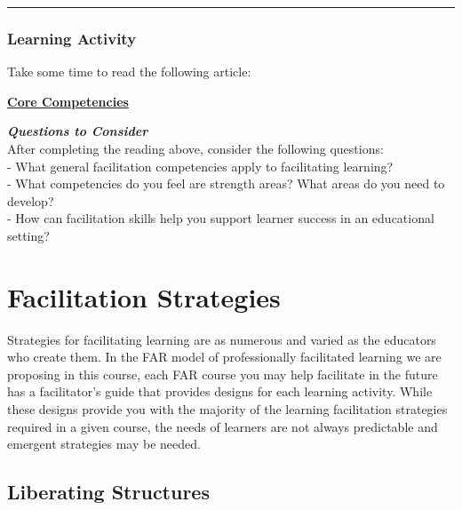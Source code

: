 \documentclass[
]{book}
\begin{document}
\begin{center}\rule{0.5\linewidth}{0.5pt}\end{center}

\begin{reflect}
\hypertarget{learning-activity-7}{%
\subsubsection{Learning Activity}\label{learning-activity-7}}

Take some time to read the following article:

\href{https://www.iaf-world.org/site/professional/core-competencies}{\textbf{Core Competencies}}

\textbf{\emph{Questions to Consider}}\\
After completing the reading above, consider the following questions:\\
- What general facilitation competencies apply to facilitating learning?\\
- What competencies do you feel are strength areas? What areas do you need to develop?\\
- How can facilitation skills help you support learner success in an educational setting?
\end{reflect}

\hypertarget{facilitation-strategies}{%
\section{Facilitation Strategies}\label{facilitation-strategies}}

Strategies for facilitating learning are as numerous and varied as the educators who create them. In the FAR model of professionally facilitated learning we are proposing in this course, each FAR course you may help facilitate in the future has a facilitator's guide that provides designs for each learning activity. While these designs provide you with the majority of the learning facilitation strategies required in a given course, the needs of learners are not always predictable and emergent strategies may be needed.

\hypertarget{liberating-structures}{%
\subsection*{Liberating Structures}\label{liberating-structures}}
\end{document}
